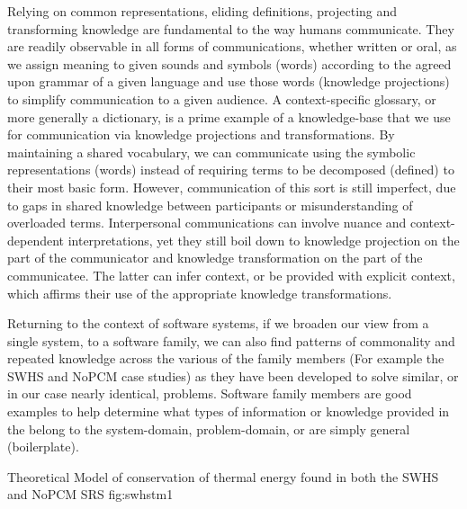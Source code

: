 Relying on common representations, eliding definitions, projecting and 
transforming knowledge are fundamental to the way humans communicate. They are 
readily observable in all forms of communications, whether written or oral, as 
we assign meaning to given sounds and symbols (words) according to the agreed 
upon grammar of a given language and use those words (knowledge projections) to 
simplify communication to a given audience. A context-specific glossary, or 
more generally a dictionary, is a prime example of a knowledge-base that we use 
for communication via knowledge projections and transformations. By maintaining 
a shared vocabulary, we can communicate using the symbolic representations 
(words) instead of requiring terms to be decomposed (defined) to their most 
basic form. However, communication of this sort is still imperfect, due to gaps 
in shared knowledge between participants or misunderstanding of overloaded 
terms. Interpersonal communications can involve nuance and context-dependent 
interpretations, yet they still boil down to knowledge projection on the part of
the communicator and knowledge transformation on the part of the communicatee.
The latter can infer context, or be provided with explicit context, which 
affirms their use of the appropriate knowledge transformations.

Returning to the context of software systems, if we broaden our view from a 
single system, to a software family, we can also find patterns of commonality 
and repeated knowledge across the various \sfs{} of the family members (For 
example the SWHS and NoPCM case studies) as they have been developed to solve 
similar, or in our case nearly identical, problems. Software family members are 
good examples to help determine what types of information or knowledge provided 
in the \sfs{} belong to the system-domain, problem-domain, or are simply 
general (boilerplate).

{Theoretical Model of conservation of thermal energy found in both the SWHS and 
NoPCM SRS}
{fig:swhstm1}

